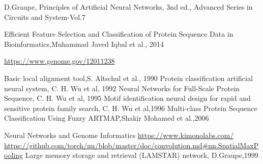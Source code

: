 \documentclass[a4paper, 10pt, conference]{ieeeconf}      %
\begin{document}
\clearpage
\newpage
\begin{thebibliography}{99}

D.Graupe, Principles of Artificial Neural Networks, 3nd ed., Advanced Series in Circuits and System-Vol.7

Efficient Feature Selection and Classification of Protein Sequence Data in Bioinformatics,Muhammad Javed Iqbal et al., 2014

\href{https://www.genome.gov/12011238}{https://www.genome.gov/12011238}

Basic local alignment tool,S. Altschul et al., 1990
Protein classification artificial neural system, C. H. Wu et al, 1992
Neural Networks for Full-Scale Protein Sequence, C. H. Wu et al, 1995
Motif identification neural design for rapid and sensitive protein family search, C. H. Wu et al,1996
Multi-class Protein Sequence Classification Using Fuzzy ARTMAP,Shakir Mohamed et al.,2006

Neural Networks and Genome Informatics
\href{https://www.kimonolabs.com/}{https://www.kimonolabs.com/}
 \href{https://github.com/torch/nn/blob/master/doc/convolution.md#nn.SpatialMaxPooling}{https://github.com/torch/nn/blob/master/doc/convolution.md\#nn.SpatialMaxPooling}
Large memory storage and retrieval (LAMSTAR) network, D.Graupe,1999
\end{thebibliography}
\end{document}
